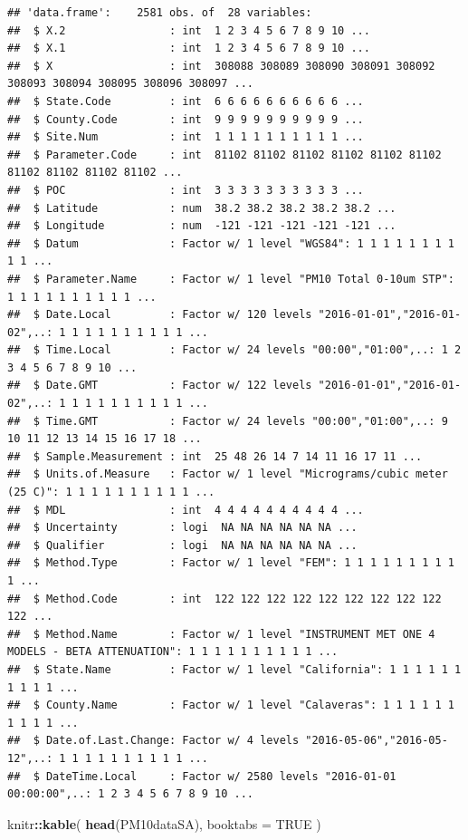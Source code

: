 \documentclass[]{book}
\newenvironment{Shaded}{\begin{snugshade}}{\end{snugshade}}
\newcommand{\DataTypeTok}[1]{\textcolor[rgb]{0.13,0.29,0.53}{#1}}
\newcommand{\KeywordTok}[1]{\textcolor[rgb]{0.13,0.29,0.53}{\textbf{#1}}}
\newcommand{\NormalTok}[1]{#1}
\newcommand{\OperatorTok}[1]{\textcolor[rgb]{0.81,0.36,0.00}{\textbf{#1}}}
\newcommand{\OtherTok}[1]{\textcolor[rgb]{0.56,0.35,0.01}{#1}}
\begin{document}
\begin{verbatim}
## 'data.frame':    2581 obs. of  28 variables:
##  $ X.2                : int  1 2 3 4 5 6 7 8 9 10 ...
##  $ X.1                : int  1 2 3 4 5 6 7 8 9 10 ...
##  $ X                  : int  308088 308089 308090 308091 308092 308093 308094 308095 308096 308097 ...
##  $ State.Code         : int  6 6 6 6 6 6 6 6 6 6 ...
##  $ County.Code        : int  9 9 9 9 9 9 9 9 9 9 ...
##  $ Site.Num           : int  1 1 1 1 1 1 1 1 1 1 ...
##  $ Parameter.Code     : int  81102 81102 81102 81102 81102 81102 81102 81102 81102 81102 ...
##  $ POC                : int  3 3 3 3 3 3 3 3 3 3 ...
##  $ Latitude           : num  38.2 38.2 38.2 38.2 38.2 ...
##  $ Longitude          : num  -121 -121 -121 -121 -121 ...
##  $ Datum              : Factor w/ 1 level "WGS84": 1 1 1 1 1 1 1 1 1 1 ...
##  $ Parameter.Name     : Factor w/ 1 level "PM10 Total 0-10um STP": 1 1 1 1 1 1 1 1 1 1 ...
##  $ Date.Local         : Factor w/ 120 levels "2016-01-01","2016-01-02",..: 1 1 1 1 1 1 1 1 1 1 ...
##  $ Time.Local         : Factor w/ 24 levels "00:00","01:00",..: 1 2 3 4 5 6 7 8 9 10 ...
##  $ Date.GMT           : Factor w/ 122 levels "2016-01-01","2016-01-02",..: 1 1 1 1 1 1 1 1 1 1 ...
##  $ Time.GMT           : Factor w/ 24 levels "00:00","01:00",..: 9 10 11 12 13 14 15 16 17 18 ...
##  $ Sample.Measurement : int  25 48 26 14 7 14 11 16 17 11 ...
##  $ Units.of.Measure   : Factor w/ 1 level "Micrograms/cubic meter (25 C)": 1 1 1 1 1 1 1 1 1 1 ...
##  $ MDL                : int  4 4 4 4 4 4 4 4 4 4 ...
##  $ Uncertainty        : logi  NA NA NA NA NA NA ...
##  $ Qualifier          : logi  NA NA NA NA NA NA ...
##  $ Method.Type        : Factor w/ 1 level "FEM": 1 1 1 1 1 1 1 1 1 1 ...
##  $ Method.Code        : int  122 122 122 122 122 122 122 122 122 122 ...
##  $ Method.Name        : Factor w/ 1 level "INSTRUMENT MET ONE 4 MODELS - BETA ATTENUATION": 1 1 1 1 1 1 1 1 1 1 ...
##  $ State.Name         : Factor w/ 1 level "California": 1 1 1 1 1 1 1 1 1 1 ...
##  $ County.Name        : Factor w/ 1 level "Calaveras": 1 1 1 1 1 1 1 1 1 1 ...
##  $ Date.of.Last.Change: Factor w/ 4 levels "2016-05-06","2016-05-12",..: 1 1 1 1 1 1 1 1 1 1 ...
##  $ DateTime.Local     : Factor w/ 2580 levels "2016-01-01 00:00:00",..: 1 2 3 4 5 6 7 8 9 10 ...
\end{verbatim}

\begin{Shaded}
\begin{Highlighting}[]
\NormalTok{knitr}\OperatorTok{::}\KeywordTok{kable}\NormalTok{(}
\KeywordTok{head}\NormalTok{(PM10dataSA),}
\DataTypeTok{booktabs =} \OtherTok{TRUE}
\NormalTok{)}
\end{Highlighting}
\end{Shaded}
\end{document}
